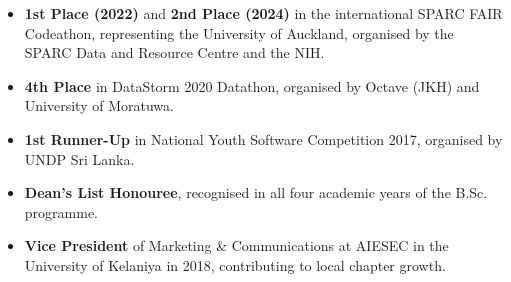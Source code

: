 \documentclass[12pt,a4paper,withhyper]{altacv}
\begin{document}
\begin{itemize}
    \item \textbf{1st Place (2022)} and \textbf{2nd Place (2024)} in the international SPARC FAIR Codeathon, representing the University of Auckland, organised by the SPARC Data and Resource Centre and the NIH.
    \item \textbf{4th Place} in DataStorm 2020 Datathon, organised by Octave (JKH) and University of Moratuwa.
    \item \textbf{1st Runner-Up} in National Youth Software Competition 2017, organised by UNDP Sri Lanka.
    \item \textbf{Dean’s List Honouree}, recognised in all four academic years of the B.Sc. programme.

    \item \textbf{Vice President} of Marketing \& Communications at AIESEC in the University of Kelaniya in 2018, contributing to local chapter growth.



\end{itemize}



\medskip






\end{document}
